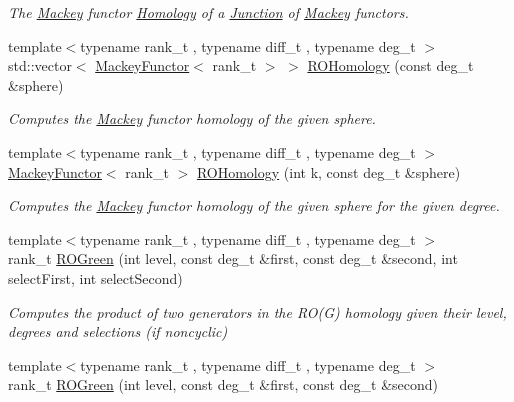 \begin{DoxyCompactItemize}
\begin{DoxyCompactList}\small\item\em The \hyperlink{namespaceMackey}{Mackey} functor \hyperlink{classMackey_1_1Homology}{Homology} of a \hyperlink{classMackey_1_1Junction}{Junction} of \hyperlink{namespaceMackey}{Mackey} functors. \end{DoxyCompactList}\item 
{\footnotesize template$<$typename rank\+\_\+t , typename diff\+\_\+t , typename deg\+\_\+t $>$ }\\std\+::vector$<$ \hyperlink{classMackey_1_1MackeyFunctor}{Mackey\+Functor}$<$ rank\+\_\+t $>$ $>$ \hyperlink{namespaceMackey_a58708ee937b0c4172b7cde8e5f856504}{R\+O\+Homology} (const deg\+\_\+t \&sphere)
\begin{DoxyCompactList}\small\item\em Computes the \hyperlink{namespaceMackey}{Mackey} functor homology of the given sphere. \end{DoxyCompactList}\item 
{\footnotesize template$<$typename rank\+\_\+t , typename diff\+\_\+t , typename deg\+\_\+t $>$ }\\\hyperlink{classMackey_1_1MackeyFunctor}{Mackey\+Functor}$<$ rank\+\_\+t $>$ \hyperlink{namespaceMackey_a5629b0a33e7c2e5c1ae403d8d36044bd}{R\+O\+Homology} (int k, const deg\+\_\+t \&sphere)
\begin{DoxyCompactList}\small\item\em Computes the \hyperlink{namespaceMackey}{Mackey} functor homology of the given sphere for the given degree. \end{DoxyCompactList}\item 
{\footnotesize template$<$typename rank\+\_\+t , typename diff\+\_\+t , typename deg\+\_\+t $>$ }\\rank\+\_\+t \hyperlink{namespaceMackey_a2bd86833844ca62d76c47a54aeb0bb77}{R\+O\+Green} (int level, const deg\+\_\+t \&first, const deg\+\_\+t \&second, int select\+First, int select\+Second)
\begin{DoxyCompactList}\small\item\em Computes the product of two generators in the R\+O(\+G) homology given their level, degrees and selections (if noncyclic) \end{DoxyCompactList}\item 
{\footnotesize template$<$typename rank\+\_\+t , typename diff\+\_\+t , typename deg\+\_\+t $>$ }\\rank\+\_\+t \hyperlink{namespaceMackey_a07d3b1e748c6cf2fd8a6e21b948a0afe}{R\+O\+Green} (int level, const deg\+\_\+t \&first, const deg\+\_\+t \&second)

\end{DoxyCompactItemize}
